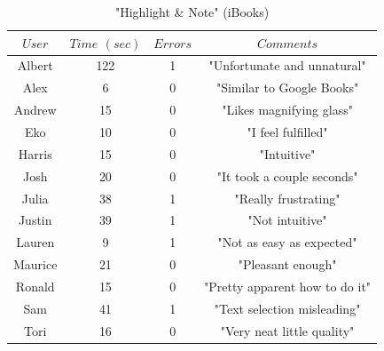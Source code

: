 \documentclass[journal, a4paper]{IEEEtran}
\begin{document}
    \begin{table}[!hbt]
		\begin{center}
		\caption{"Highlight \& Note" (iBooks)}
		\label{tab:task2learniBooks}
		\begin{tabular}{|c|c|c|c|}
			\hline
			$User$ & $Time$ $(sec)$ & $Errors$ & $Comments$\\
			\hline
            Albert & 122 & 1 & "Unfortunate and unnatural"\\
			\hline
			Alex & 6 & 0 & "Similar to Google Books"\\
			\hline
            Andrew & 15 & 0 & "Likes magnifying glass"\\
			\hline
			Eko & 10 & 0 & "I feel fulfilled"\\
			\hline
            Harris & 15 & 0 & "Intuitive"\\
			\hline
			Josh & 20 & 0 & "It took a couple seconds"\\
			\hline
            Julia & 38 & 1 & "Really frustrating"\\
			\hline
            Justin & 39 & 1 & "Not intuitive"\\
			\hline
            Lauren & 9 & 1 & "Not as easy as expected"\\
			\hline
            Maurice & 21 & 0 & "Pleasant enough"\\
			\hline
            Ronald & 15 & 0 & "Pretty apparent how to do it"\\
			\hline
            Sam & 41 & 1 & "Text selection misleading"\\
			\hline
            Tori & 16 & 0 & "Very neat little quality"\\
			\hline
		\end{tabular}
		\end{center}
	\end{table}
    
\end{document}
